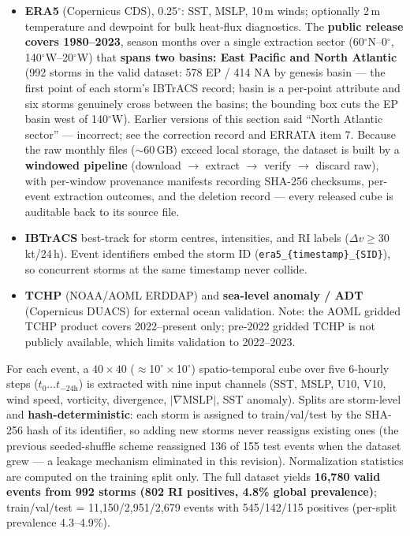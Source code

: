 \documentclass[11pt]{article}
\begin{document}
\begin{itemize}
  \item \textbf{ERA5} (Copernicus CDS), 0.25$^{\circ}$: SST, MSLP, 10\,m
        winds; optionally 2\,m temperature and dewpoint for bulk heat-flux
        diagnostics. The \textbf{public release covers 1980--2023}, season
        months over a single extraction sector (60$^{\circ}$N--0$^{\circ}$,
        140$^{\circ}$W--20$^{\circ}$W) that \textbf{spans two basins: East
        Pacific and North Atlantic} (992 storms in the valid dataset: 578 EP
        / 414 NA by genesis basin --- the first point of each storm's
        IBTrACS record; basin is a per-point attribute and six storms
        genuinely cross between the basins; the bounding box cuts the EP
        basin west of 140$^{\circ}$W). Earlier versions of this section said
        ``North Atlantic sector'' --- incorrect; see the correction record
        and ERRATA item 7. Because the raw monthly files
        ($\sim$60\,GB) exceed local storage, the dataset is built by a
        \textbf{windowed pipeline} (download $\rightarrow$ extract
        $\rightarrow$ verify $\rightarrow$ discard raw), with per-window
        provenance manifests recording SHA-256 checksums, per-event
        extraction outcomes, and the deletion record --- every released cube
        is auditable back to its source file.
  \item \textbf{IBTrACS} best-track for storm centres, intensities, and RI
        labels ($\Delta v \geq 30$\,kt/24\,h). Event identifiers embed the
        storm ID (\texttt{era5\_\{timestamp\}\_\{SID\}}), so concurrent storms
        at the same timestamp never collide.
  \item \textbf{TCHP} (NOAA/AOML ERDDAP) and \textbf{sea-level anomaly / ADT}
        (Copernicus DUACS) for external ocean validation. Note: the AOML
        gridded TCHP product covers 2022--present only; pre-2022 gridded TCHP
        is not publicly available, which limits validation to 2022--2023.
\end{itemize}

For each event, a $40\times40$ ($\approx$10$^{\circ}\times$10$^{\circ}$)
spatio-temporal cube over five 6-hourly steps ($t_0 \ldots t_{-24\mathrm{h}}$)
is extracted with nine input channels (SST, MSLP, U10, V10, wind speed,
vorticity, divergence, $|\nabla \mathrm{MSLP}|$, SST anomaly). Splits are
storm-level and \textbf{hash-deterministic}: each storm is assigned to
train/val/test by the SHA-256 hash of its identifier, so adding new storms
never reassigns existing ones (the previous seeded-shuffle scheme reassigned
136 of 155 test events when the dataset grew --- a leakage mechanism
eliminated in this revision). Normalization statistics are computed on the
training split only. The full dataset yields \textbf{16{,}780 valid events
from 992 storms (802 RI positives, 4.8\% global prevalence)}; train/val/test =
11{,}150/2{,}951/2{,}679 events with 545/142/115 positives (per-split
prevalence 4.3--4.9\%).
\end{document}
